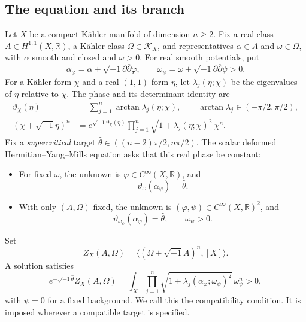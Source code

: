 \documentclass[12pt,reqno]{amsart}
\numberwithin{equation}{section}
\theoremstyle{plain}
\theoremstyle{definition}
\newcommand{\ddbar}{\sqrt{-1}\partial\overline{\partial}}
\newcommand{\cK}{\mathcal K}
\newcommand{\R}{\mathbb R}
\begin{document}
\subsection{The equation and its branch}
Let $X$ be a compact K\"ahler manifold of dimension $n\geq2$.
Fix a real class $A\in H^{1,1}(X,\R)$, a K\"ahler class
$\Omega\in\cK_X$, and representatives $\alpha\in A$ and
$\omega\in\Omega$, with $\alpha$ smooth and closed and $\omega>0$.
For real smooth potentials, put
\begin{equation}\label{potentials-and-cohomology-classes}
 \alpha_\varphi=\alpha+\ddbar\varphi,\qquad
 \omega_\psi=\omega+\ddbar\psi>0.
\end{equation}
For a K\"ahler form $\chi$ and a real $(1,1)$-form $\eta$, let
$\lambda_j(\eta;\chi)$ be the eigenvalues of $\eta$ relative to $\chi$.
The phase and its determinant identity are
\begin{align}
 \vartheta_\chi(\eta)
 &=\sum_{j=1}^n\arctan\lambda_j(\eta;\chi),
 \qquad \arctan\lambda_j\in(-\pi/2,\pi/2),
 \label{scalar-phase-operator}\\
 (\chi+\sqrt{-1}\eta)^n
 &=e^{\sqrt{-1}\vartheta_\chi(\eta)}
   \prod_{j=1}^n\sqrt{1+\lambda_j(\eta;\chi)^2}\,\chi^n.
 \label{eigenvalue-identity}
\end{align}
Fix a \emph{supercritical} target
$\widehat\theta\in((n-2)\pi/2,n\pi/2)$.
The scalar deformed Hermitian--Yang--Mills equation asks that this
real phase be constant:
\begin{itemize}
\item For fixed $\omega$, the unknown is
$\varphi\in C^\infty(X,\R)$, and
\begin{equation}\label{dHYM-equation}
 \vartheta_\omega(\alpha_\varphi)=\widehat\theta.
\end{equation}
\item With only $(A,\Omega)$ fixed, the unknown is
$(\varphi,\psi)\in C^\infty(X,\R)^2$, and
\begin{equation}\label{dHYM-with-varying-background}
 \vartheta_{\omega_\psi}(\alpha_\varphi)=\widehat\theta,
 \qquad \omega_\psi>0.
\end{equation}
\end{itemize}
Set
\begin{equation}\label{central-charge}
 Z_X(A,\Omega)=\big\langle(\Omega+\sqrt{-1}A)^n,[X]\big\rangle.
\end{equation}
A solution satisfies
\begin{equation}\label{phase-compatibility}
 e^{-\sqrt{-1}\widehat\theta}Z_X(A,\Omega)
 =\int_X\prod_{j=1}^n
   \sqrt{1+\lambda_j(\alpha_\varphi;\omega_\psi)^2}\,
   \omega_\psi^n>0,
\end{equation}
with $\psi=0$ for a fixed background. We call this the compatibility
condition. It is imposed wherever a compatible target is specified.
\end{document}
